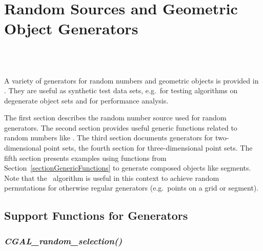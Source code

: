 
\beforecprogskip\medskipamount
\aftercprogskip\medskipamount
\ccParDims

\chapter{Random Sources and Geometric Object Generators}
\label{chapterGenerators}
\\
\\


A variety of generators for random numbers and geometric objects is
provided in \cgal.  They are useful as synthetic test data sets,
e.g.~for testing algorithms on degenerate object sets and for
performance analysis.

The first section describes the random number source used for random
generators. The second section provides useful generic functions
related to random numbers like . The
third section documents generators for two-dimensional point sets, the
fourth section for three-dimensional point sets. The fifth section
presents examples using functions from
Section~\ref{sectionGenericFunctions} to generate composed objects
like segments.  Note that the \stl\ algorithm  is
useful in this context to achieve random permutations for otherwise
regular generators (e.g.~points on a grid or segment).




\section{Support Functions for Generators}


\subsection{{\it CGAL\_random\_selection()}}
\label{sectionRandomSelection}


